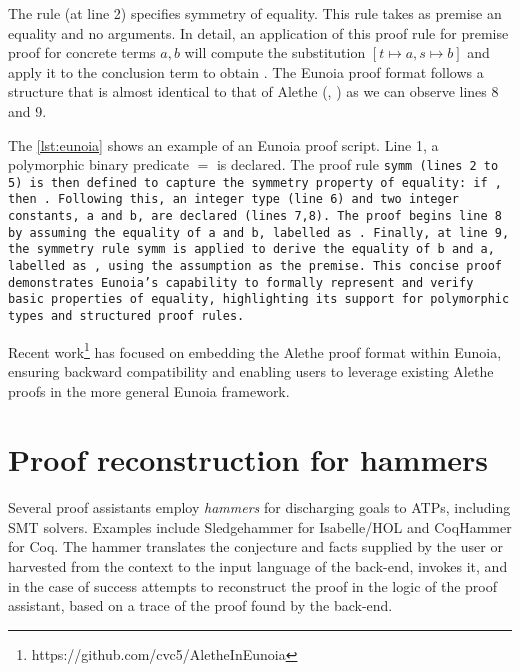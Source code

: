 The rule  (at line 2) specifies symmetry of equality. This rule takes as premise an equality  and no arguments.
In detail, an application of this proof rule for premise proof  for concrete terms $a,b$ will compute the substitution $[t \mapsto a, s \mapsto b]$ and apply it to the conclusion term to obtain .
The Eunoia proof format follows a structure that is almost identical to that of Alethe (, ) as we can observe lines 8 and 9.

The \cref{lst:eunoia} shows an example of an Eunoia proof script. Line 1, a polymorphic binary predicate $=$ is declared.
The proof rule \tt{symm} (lines 2 to 5) is then defined to capture the symmetry property of equality: if , then .
Following this, an integer type  (line 6) and two integer constants, \tt{a} and \tt{b}, are declared (lines 7,8).
The proof begins line 8 by assuming the equality of \tt{a} and \tt{b}, labelled as .
Finally, at line 9, the symmetry rule \tt{symm} is applied to derive the equality of \tt{b} and \tt{a}, labelled as , using the assumption  as the premise.
This concise proof demonstrates Eunoia's capability to formally represent and verify basic properties of equality, highlighting its support for polymorphic types and structured proof rules.

Recent work\footnote{https://github.com/cvc5/AletheInEunoia} has focused on embedding the Alethe proof format within Eunoia, ensuring backward compatibility and enabling users to leverage existing Alethe proofs in the more general Eunoia framework.

\section{Proof reconstruction for hammers}

Several proof assistants employ \emph{hammers} for discharging goals to ATPs, including SMT solvers. Examples include Sledgehammer \cite{Sledgehammer} for Isabelle/HOL and CoqHammer \cite{coqhammer1,coqhammer2} for Coq.
The hammer translates the conjecture and facts supplied by the user or harvested
from the context to the input language of the back-end, invokes it, and in the
case of success attempts to reconstruct the proof in the logic of the proof
assistant, based on a trace of the proof found by the back-end.

